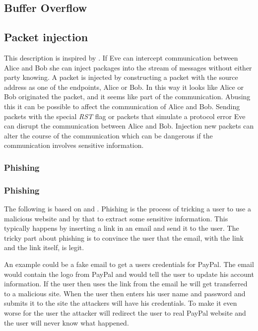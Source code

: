 
\subsection{Buffer Overflow}


\subsection{Packet injection}
This description is inspired by \cite{packetinjection}.
If Eve can intercept communication between Alice and Bob she can inject packages into the stream of messages without either party knowing.
A packet is injected by constructing a packet with the source address as one of the endpoints, Alice or Bob.
In this way it looks like Alice or Bob originated the packet, and it seems like part of the communication.
Abusing this it can be possible to affect the communication of Alice and Bob.
Sending packets with the special \emph{RST} flag or packets that simulate a protocol error Eve can disrupt the communication between Alice and Bob.
Injection new packets can alter the course of the communication which can be dangerous if the communication involves sensitive information.\subsubsection{Phishing}

\subsubsection{Phishing}
The following is based on \citet{security_engineering_ross_anderson} and \citet{dhamija2006phishing}.
Phishing is the process of tricking a user to use a malicious website and by that to extract some sensitive information.
This typically happens by inserting a link in an email and send it to the user.
The tricky part about phishing is to convince the user that the email, with the link and the link itself, is legit.

An example could be a fake email to get a users credentials for PayPal.
The email would contain the logo from PayPal and would tell the user to update his account information.
If the user then uses the link from the email he will get transferred to a malicious site.
When the user then enters his user name and password and submits it to the site the attackers will have his credentials.
To make it even worse for the user the attacker will redirect the user to real PayPal website and the user will never know what happened.

